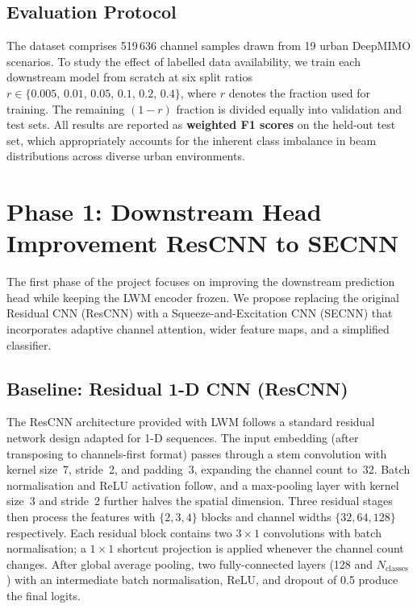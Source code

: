 \documentclass[12pt,a4paper]{article}
\begin{document}
\subsection{Evaluation Protocol}\label{subsec:eval}

The dataset comprises 519\,636 channel samples drawn from 19 urban DeepMIMO scenarios.  To study the effect of labelled data availability, we train each downstream model from scratch at six split ratios $r\in\{0.005,\,0.01,\,0.05,\,0.1,\,0.2,\,0.4\}$, where $r$ denotes the fraction used for training.  The remaining $(1-r)$ fraction is divided equally into validation and test sets.  All results are reported as \textbf{weighted F1 scores} on the held-out test set, which appropriately accounts for the inherent class imbalance in beam distributions across diverse urban environments.


\newpage
\section{Phase 1: Downstream Head Improvement    ResCNN to SECNN}\label{sec:phase1}

The first phase of the project focuses on improving the downstream prediction head while keeping the LWM encoder frozen.  We propose replacing the original Residual CNN (ResCNN) with a Squeeze-and-Excitation CNN (SECNN) that incorporates adaptive channel attention, wider feature maps, and a simplified classifier.

\subsection{Baseline: Residual 1-D CNN (ResCNN)}\label{subsec:rescnn}

The ResCNN architecture provided with LWM follows a standard residual network design adapted for 1-D sequences.  The input embedding (after transposing to channels-first format) passes through a stem convolution with kernel size~7, stride~2, and padding~3, expanding the channel count to~32.  Batch normalisation and ReLU activation follow, and a max-pooling layer with kernel size~3 and stride~2 further halves the spatial dimension.  Three residual stages then process the features with $\{2,3,4\}$ blocks and channel widths $\{32,64,128\}$ respectively.  Each residual block contains two $3\times1$ convolutions with batch normalisation; a $1\times1$ shortcut projection is applied whenever the channel count changes.  After global average pooling, two fully-connected layers (128 and $N_{\text{classes}}$) with an intermediate batch normalisation, ReLU, and dropout of 0.5 produce the final logits.
\end{document}
